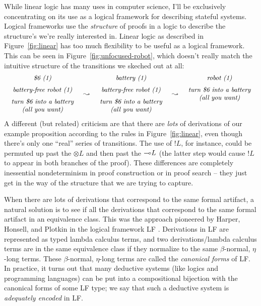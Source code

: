 While linear logic has many uses in computer science, I'll be
exclusively concentrating on its use as a logical framework for
describing stateful systems. Logical frameworks use the {\it
  structure} of proofs in a logic to describe the structure's we're
really interested in. Linear logic as described in Figure~\ref{fig:linear}
has too much flexibility to be useful as a logical framework. This can be
seen in 
Figure~\ref{fig:unfocused-robot}, which doesn't really match the intuitive
structure of the transitions we skeched out at all:
\[
\begin{array}{ccccc}
\begin{array}{c}
\mbox{\it \$6 (1)}\medskip\\ 
\mbox{\it battery-free robot (1)} \medskip\\ 
\mbox{\it turn \$6 into a battery}\\
\mbox{\it (all you want)}
\end{array}
& \leadsto &
\begin{array}{c}
\mbox{\it battery  (1)}\medskip\\ 
\mbox{\it battery-free robot (1)} \medskip\\ 
\mbox{\it turn \$6 into a battery}\\
\mbox{\it (all you want)}
\end{array}
& \leadsto &
\begin{array}{c}
\mbox{\it robot (1)} \medskip\\ 
\mbox{\it turn \$6 into a battery}\\
\mbox{\it (all you want)}\medskip\\~\\
\end{array}
\end{array}
\]
A different (but related) criticism are that there are {\it lots} of
derivations of our example proposition according to the rules in
Figure~\ref{fig:linear}, even though there's only one ``real'' series
of transitions. The use of ${!}L$, for instance, could be permuted up
past the ${\otimes}L$ and then past the ${\multimap}L$ (the latter step
would cause ${!}L$ to appear in both branches of the proof). These
differences are completely inessential nondeterminism in proof
construction or in proof search -- they just get in the way of the
structure that we are trying to capture.

When there are lots of derivations that correspond to the same formal
artifact, a natural solution is to see if all the derivations that
correspond to the same formal artifact in an equivalence class.  This
was the approach pioneered by Harper, Honsell, and Plotkin in the
logical framework LF \cite{harper93framework}. Derivations in LF are
represented as typed lambda calculus terms, and two derivations/lambda
calculus terms are in the same equivalence class if they normalize to
the same $\beta$-normal, $\eta$-long terms. These $\beta$-normal,
$\eta$-long terms are called the {\it canonical forms} of LF. In
practice, it turns out that many deductive systems (like logics and
programming languages) can be put into a compositional bijection with
the canonical forms of some LF type; we say that such a deductive
system is {\it adequately encoded} in LF.

